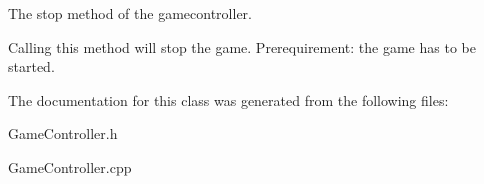 The stop method of the gamecontroller. 

Calling this method will stop the game. Prerequirement\-: the game has to be started. 

The documentation for this class was generated from the following files\-:\begin{DoxyCompactItemize}
\item 
Game\-Controller.\-h\item 
Game\-Controller.\-cpp\end{DoxyCompactItemize}
